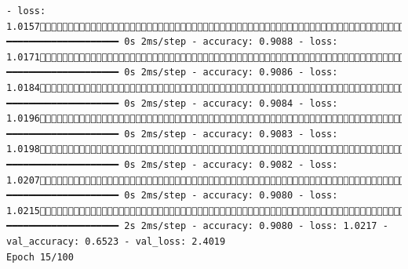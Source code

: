 \documentclass[
  letterpaper,
  DIV=11,
  numbers=noendperiod]{scrartcl}
\begin{document}
\begin{verbatim}
- loss: 1.0157726/858 ━━━━━━━━━━━━━━━━━━━━ 0s 2ms/step - accuracy: 0.9088 - loss: 1.0171763/858 ━━━━━━━━━━━━━━━━━━━━ 0s 2ms/step - accuracy: 0.9086 - loss: 1.0184794/858 ━━━━━━━━━━━━━━━━━━━━ 0s 2ms/step - accuracy: 0.9084 - loss: 1.0196800/858 ━━━━━━━━━━━━━━━━━━━━ 0s 2ms/step - accuracy: 0.9083 - loss: 1.0198825/858 ━━━━━━━━━━━━━━━━━━━━ 0s 2ms/step - accuracy: 0.9082 - loss: 1.0207851/858 ━━━━━━━━━━━━━━━━━━━━ 0s 2ms/step - accuracy: 0.9080 - loss: 1.0215858/858 ━━━━━━━━━━━━━━━━━━━━ 2s 2ms/step - accuracy: 0.9080 - loss: 1.0217 - val_accuracy: 0.6523 - val_loss: 2.4019
Epoch 15/100

\end{verbatim}
\end{document}
